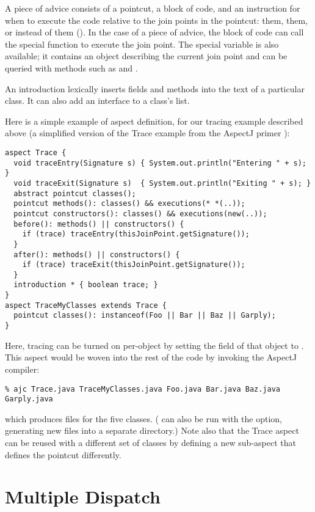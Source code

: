 \documentclass[12pt]{article}
\begin{document}
A piece of advice consists of a pointcut, a block of code, and an
instruction for when to execute the code relative to the join points
in the pointcut:  them,  them, or instead
of them ().  In the case of a piece of 
advice, the block of code can call the special function
 to execute the join point.  The special variable
 is also available; it contains an object
describing the current join point and can be queried with methods such 
as  and .

An introduction lexically inserts fields and methods into the text of
a particular class.  It can also add an interface to a class's
 list.

Here is a simple example of aspect definition, for our tracing example 
described above (a simplified version of the Trace example from the
AspectJ primer \cite{AspectJ}):
\begin{verbatim}
aspect Trace {
  void traceEntry(Signature s) { System.out.println("Entering " + s); }
  void traceExit(Signature s)  { System.out.println("Exiting " + s); }
  abstract pointcut classes();
  pointcut methods(): classes() && executions(* *(..));
  pointcut constructors(): classes() && executions(new(..));
  before(): methods() || constructors() {
    if (trace) traceEntry(thisJoinPoint.getSignature());
  }
  after(): methods() || constructors() {
    if (trace) traceExit(thisJoinPoint.getSignature());
  }
  introduction * { boolean trace; }
}
aspect TraceMyClasses extends Trace {
  pointcut classes(): instanceof(Foo || Bar || Baz || Garply);
}
\end{verbatim}
Here, tracing can be turned on per-object by setting the 
field of that object to .  This aspect would be woven into
the rest of the code by invoking the AspectJ compiler:
\begin{verbatim}
% ajc Trace.java TraceMyClasses.java Foo.java Bar.java Baz.java Garply.java
\end{verbatim}
which produces  files for the five classes.  (
can also be run with the  option, generating new
 files into a separate directory.)  Note also that the
Trace aspect can be reused with a different set of classes by defining 
a new sub-aspect that defines the  pointcut differently.

\section{Multiple Dispatch}
\end{document}
